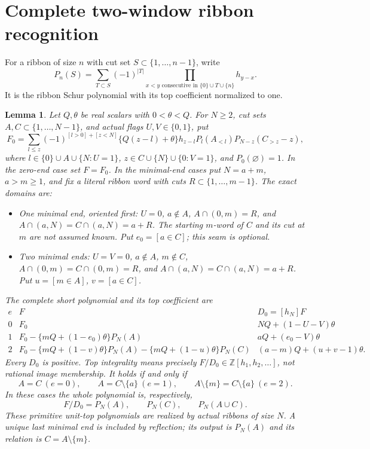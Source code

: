 \documentclass[11pt,a4paper]{amsart}
\numberwithin{equation}{section}
\theoremstyle{plain}
\newtheorem{lemma}[theorem]{Lemma}
\theoremstyle{definition}
\begin{document}
\section{Complete two-window ribbon recognition}\label{sec:recovered-recognition}
For a ribbon of size \(n\) with cut set \(S\subset\{1,\ldots,n-1\}\), write
\[
 P_n(S)=\sum_{T\subset S}(-1)^{|T|}\prod_{x<y\text{ consecutive in }\{0\}\cup T\cup\{n\}}h_{y-x}.
\]
It is the ribbon Schur polynomial with its top coefficient normalized to one.

\begin{lemma}\label{lem:oo-window-construction}
Let \(Q,\theta\) be real scalars with \(0<\theta<Q\).  For \(N\ge2\), cut sets \(A,C\subset\{1,\ldots,N-1\}\), and actual flags \(U,V\in\{0,1\}\), put
\begin{equation}\label{eq:oo-window-sum}
 F_0=\sum_{l\le z}(-1)^{[l>0]+[z<N]}
 \{Q(z-l)+\theta\}h_{z-l}
 P_l(A_{<l})P_{N-z}(C_{>z}-z),
\end{equation}
where \(l\in\{0\}\cup A\cup\{N:U=1\}\),
\(z\in C\cup\{N\}\cup\{0:V=1\}\), and \(P_0(\varnothing)=1\).
In the zero-end case set \(F=F_0\).  In the minimal-end cases put
\(N=a+m\), \(a>m\ge1\), and fix a literal ribbon word with cuts
\(R\subset\{1,\ldots,m-1\}\).  The exact domains are:
\begin{itemize}
\item One minimal end, oriented first: \(U=0\), \(a\notin A\),
\(A\cap(0,m)=R\), and
\(A\cap(a,N)=C\cap(a,N)=a+R\).
The starting \(m\)-word of \(C\) and its cut at \(m\) are not assumed known.
Put \(e_0=[a\in C]\); this seam is optional.
\item Two minimal ends: \(U=V=0\), \(a\notin A\), \(m\notin C\),
\(A\cap(0,m)=C\cap(0,m)=R\), and
\(A\cap(a,N)=C\cap(a,N)=a+R\).
Put \(u=[m\in A]\), \(v=[a\in C]\).
\end{itemize}
The complete short polynomial and its top coefficient are
\[
\begin{array}{c|l|l}
 e&F&D_0=[h_N]F\\\hline
0&F_0&NQ+(1-U-V)\theta\\
1&F_0-\{mQ+(1-e_0)\theta\}P_N(A)&aQ+(e_0-V)\theta\\
2&F_0-\{mQ+(1-v)\theta\}P_N(A)
       -\{mQ+(1-u)\theta\}P_N(C)&(a-m)Q+(u+v-1)\theta.
\end{array}
\]
Every \(D_0\) is positive.  Top integrality means precisely
\(F/D_0\in\mathbb Z[h_1,h_2,\ldots]\), not rational image membership.
It holds if and only if
\[
 A=C\ (e=0),\qquad A=C\setminus\{a\}\ (e=1),\qquad
 A\setminus\{m\}=C\setminus\{a\}\ (e=2).
\]
In these cases the whole polynomial is, respectively,
\[
 F/D_0=P_N(A),\qquad P_N(C),\qquad P_N(A\cup C).
\]
These primitive unit-top polynomials are realized by actual ribbons of size
\(N\).  A unique last minimal end is included by reflection; its output is
\(P_N(A)\) and its relation is \(C=A\setminus\{m\}\).


\end{lemma}
\end{document}
